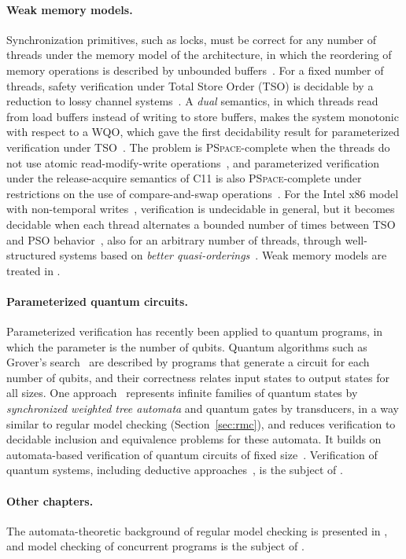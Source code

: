 \paragraph{Weak memory models.}
Synchronization primitives, such as locks, must be correct for any number of
threads under the memory model of the architecture, in which the reordering of
memory operations is described by unbounded buffers~\cite{OSS09,SSONM10,AMT14}. For a fixed number of threads,
safety verification under Total Store Order (TSO) is decidable by a reduction
to lossy channel systems~\cite{ABBM10}. A \emph{dual} semantics, in which
threads read from load buffers instead of writing to store buffers, makes the
system monotonic with respect to a WQO, which gave the first decidability
result for parameterized verification under TSO~\cite{AABN16,AABN18}. The
problem is \textsc{PSpace}-complete when the threads do not use atomic
read-modify-write operations~\cite{AAR20}, and parameterized verification under
the release-acquire semantics of C11 is also \textsc{PSpace}-complete under
restrictions on the use of compare-and-swap operations~\cite{KGMC22}. For the
Intel x86 model with non-temporal writes~\cite{RMV22}, verification is
undecidable in general, but it becomes decidable when each thread alternates a
bounded number of times between TSO and PSO behavior~\cite{AABKS24}, also for
an arbitrary number of threads, through well-structured systems based on
\emph{better quasi-orderings}~\cite{AABKS26,Mar94,Abd10}. Weak memory models are
treated in .

\paragraph{Parameterized quantum circuits.}
Parameterized verification has recently been applied to quantum programs, in
which the parameter is the number of qubits. Quantum algorithms such as
Grover's search~\cite{Gro96} are described by programs that generate a circuit
for each number of qubits, and their correctness relates input states to
output states for all sizes. One approach~\cite{AutoQPara} represents infinite
families of quantum states by \emph{synchronized weighted tree automata} and
quantum gates by transducers, in a way similar to regular model checking
(Section~\ref{sec:rmc}), and reduces verification to decidable inclusion and
equivalence problems for these automata. It builds on automata-based
verification of quantum circuits of fixed
size~\cite{CCLLTY23,CCLLT23,LSTA25,AutoQ20}. Verification of quantum systems,
including deductive approaches~\cite{Yin11,Qbricks,HRHWH21,Amy19}, is the
subject of .

\paragraph{Other chapters.}
The automata-theoretic background of regular model checking is presented in
, and model checking of concurrent programs is the subject of
.
